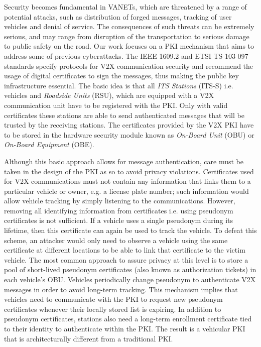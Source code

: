 Security becomes fundamental in VANETs, which are threatened by a range of potential attacks, such as distribution of forged messages, tracking of user vehicles and denial of service. The consequences of such threats can be extremely serious, and may range from disruption of the transportation to serious damage to public safety on the road. Our work focuses on a PKI mechanism that aims to address some of previous cyberattacks. The IEEE 1609.2 \cite{iee_formats} and ETSI TS 103 097 standards \cite{etsi_formats} specify protocols for V2X communication security and recommend the usage of digital certificates to sign the messages, thus making the public key infrastructure essential. The basic idea is that all \textit{ITS Stations} (ITS-S) i.e. vehicles and \textit{Roadside Units} (RSU), which are equipped with a V2X communication unit have to be registered with the PKI. Only with valid certificates these stations are able to send authenticated messages that will be trusted by the receiving stations. The certificates provided by the V2X PKI have to be stored in the hardware security module known as \textit{On-Board Unit} (OBU) or \textit{On-Board Equipment} (OBE).

Although this basic approach allows for message authentication, care must be taken in the design of the PKI as so to avoid privacy violations. Certificates used for V2X communications must not contain any information that links them to a particular vehicle or owner, e.g. a license plate number; such information would allow vehicle tracking by simply listening to the communications. However, removing all identifying information from certificates i.e. using pseudonym certificates is not sufficient. If a vehicle uses a single pseudonym during its lifetime, then this certificate can again be used to track the vehicle. To defeat this scheme, an attacker would only need to observe a vehicle using the same certificate at different locations to be able to link that certificate to the victim vehicle. The most common approach to assure privacy at this level is to store a pool of short-lived pseudonym certificates (also known as authorization tickets) in each vehicle's OBU. Vehicles periodically change pseudonym to authenticate V2X messages in order to avoid long-term tracking. This mechanism implies that vehicles need to communicate with the PKI to request new pseudonym certificates whenever their locally stored list is expiring. In addition to pseudonym certificates, stations also need a long-term enrollment certificate tied to their identity to authenticate within the PKI. The result is a vehicular PKI that is architecturally different from a traditional PKI. 


